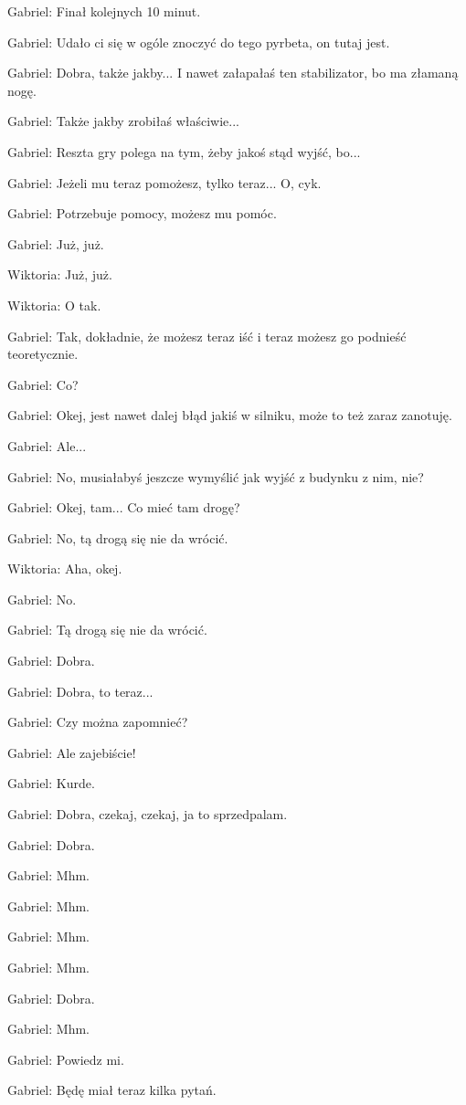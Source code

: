 Gabriel: Finał kolejnych 10 minut.

Gabriel: Udało ci się w ogóle znoczyć do tego pyrbeta, on tutaj jest.

Gabriel: Dobra, także jakby... I nawet załapałaś ten stabilizator, bo ma złamaną nogę.

Gabriel: Także jakby zrobiłaś właściwie...

Gabriel: Reszta gry polega na tym, żeby jakoś stąd wyjść, bo...

Gabriel: Jeżeli mu teraz pomożesz, tylko teraz... O, cyk.

Gabriel: Potrzebuje pomocy, możesz mu pomóc.

Gabriel: Już, już.

Wiktoria: Już, już.

Wiktoria: O tak.

Gabriel: Tak, dokładnie, że możesz teraz iść i teraz możesz go podnieść teoretycznie.

Gabriel: Co?

Gabriel: Okej, jest nawet dalej błąd jakiś w silniku, może to też zaraz zanotuję.

Gabriel: Ale...

Gabriel: No, musiałabyś jeszcze wymyślić jak wyjść z budynku z nim, nie?

Gabriel: Okej, tam... Co mieć tam drogę?

Gabriel: No, tą drogą się nie da wrócić.

Wiktoria: Aha, okej.

Gabriel: No.

Gabriel: Tą drogą się nie da wrócić.

Gabriel: Dobra.

Gabriel: Dobra, to teraz...

Gabriel: Czy można zapomnieć?

Gabriel: Ale zajebiście!

Gabriel: Kurde.

Gabriel: Dobra, czekaj, czekaj, ja to sprzedpalam.

Gabriel: Dobra.

Gabriel: Mhm.

Gabriel: Mhm.

Gabriel: Mhm.

Gabriel: Mhm.

Gabriel: Dobra.

Gabriel: Mhm.

Gabriel: Powiedz mi.

Gabriel: Będę miał teraz kilka pytań.

